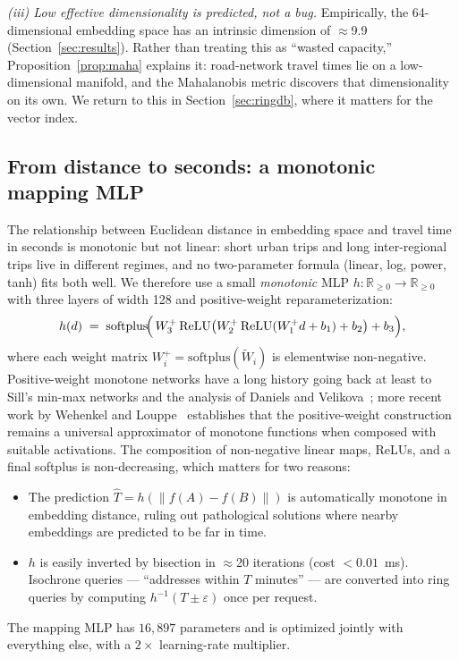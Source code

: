 \documentclass[11pt,a4paper]{article}
\begin{document}
\emph{(iii) Low effective dimensionality is predicted, not a bug.}
Empirically, the 64-dimensional embedding space has an intrinsic
dimension of $\approx$9.9 (Section~\ref{sec:results}). Rather than
treating this as ``wasted capacity,'' Proposition~\ref{prop:maha}
explains it: road-network travel times lie on a low-dimensional
manifold, and the Mahalanobis metric discovers that dimensionality
on its own. We return to this in Section~\ref{sec:ringdb}, where it
matters for the vector index.

\subsection{From distance to seconds: a monotonic mapping MLP}
The relationship between Euclidean distance in embedding space and
travel time in seconds is monotonic but not linear: short urban trips
and long inter-regional trips live in different regimes, and no
two-parameter formula (linear, log, power, tanh) fits both well. We
therefore use a small \emph{monotonic} MLP
$h : \mathbb{R}_{\geq 0} \to \mathbb{R}_{\geq 0}$ with three layers
of width 128 and positive-weight reparameterization:
\[
  h(d) \;=\; \mathrm{softplus}\!\Bigl(\,W_{3}^{+}\,
    \mathrm{ReLU}\bigl(W_{2}^{+}\,
      \mathrm{ReLU}(W_{1}^{+} d + b_{1})
    + b_{2}\bigr) + b_{3}\Bigr),
\]
where each weight matrix
$W_{i}^{+} = \mathrm{softplus}(\widetilde W_{i})$ is elementwise
non-negative. Positive-weight monotone networks have a long history
going back at least to Sill's min-max networks and the analysis of
Daniels and Velikova~\cite{daniels2010monotone}; more recent work by
Wehenkel and Louppe~\cite{wehenkel2019umnn} establishes that the
positive-weight construction remains a universal approximator of
monotone functions when composed with suitable activations. The
composition of non-negative linear maps, ReLUs, and a final softplus
is non-decreasing, which matters for two reasons:

\begin{itemize}
  \item The prediction $\hat T = h(\|f(A) - f(B)\|)$ is automatically
    monotone in embedding distance, ruling out pathological solutions
    where nearby embeddings are predicted to be far in time.
  \item $h$ is easily inverted by bisection in $\approx$20 iterations
    (cost $< 0.01$~ms). Isochrone queries --- ``addresses within
    $T$ minutes'' --- are converted into ring queries by computing
    $h^{-1}(T \pm \varepsilon)$ once per request.
\end{itemize}
The mapping MLP has $16{,}897$ parameters and is optimized jointly
with everything else, with a $2\times$ learning-rate multiplier.
\end{document}

